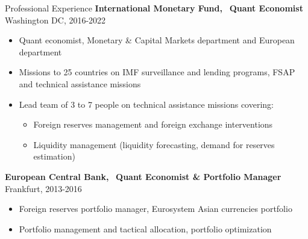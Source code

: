 \documentclass[usegeometry, 10pt, a4paper]{cv} %
\newcommand{\activite}[1]{\textbf{#1}\ }
\begin{document}
\begin{rubriquetableau}[0.95\textwidth]{Professional Experience}
\activite{International Monetary Fund,} \textbf{Quant Economist} \hfill Washington DC, 2016-2022 \\
\vspace{-0.2cm}

\begin{itemize}[label={}, rightmargin=\dimexpr\linewidth-13cm-\leftmargin\relax]
\item Quant economist, Monetary \& Capital Markets department and European department
\item Missions to 25 countries on IMF surveillance and lending programs, FSAP and technical assistance missions
\item Lead team of 3 to 7 people on technical assistance missions covering:
  \begin{itemize}
  \item Foreign reserves management and foreign exchange interventions
  \item Liquidity management (liquidity forecasting, demand for reserves estimation)
  \end{itemize}
 \end{itemize}
 
\vspace{0.2cm}

\activite{European Central Bank,} \textbf{Quant Economist \& Portfolio Manager} \hfill Frankfurt, 2013-2016 \\
\vspace{-0.2cm}

\begin{itemize}[label={}, rightmargin=\dimexpr\linewidth-13cm-\leftmargin\relax]
\item Foreign reserves portfolio manager, Eurosystem Asian currencies portfolio 
\item Portfolio management and tactical allocation, portfolio optimization
\end{itemize}
\end{rubriquetableau}


\newpage
\end{document}
